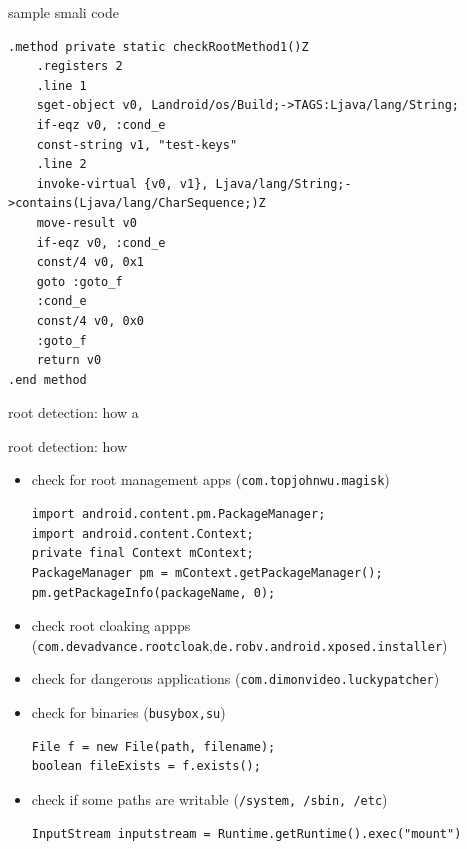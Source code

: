 \documentclass{beamer}
\begin{document}



\begin{frame}[fragile]{sample smali code}

\begin{verbatim}
.method private static checkRootMethod1()Z
    .registers 2
    .line 1
    sget-object v0, Landroid/os/Build;->TAGS:Ljava/lang/String;
    if-eqz v0, :cond_e
    const-string v1, "test-keys"
    .line 2
    invoke-virtual {v0, v1}, Ljava/lang/String;->contains(Ljava/lang/CharSequence;)Z
    move-result v0
    if-eqz v0, :cond_e
    const/4 v0, 0x1
    goto :goto_f
    :cond_e
    const/4 v0, 0x0
    :goto_f
    return v0
.end method
\end{verbatim}
    
\end{frame}

\begin{frame}[fragile]{root detection: how}
a
\end{frame}

\begin{frame}[fragile]{root detection: how}

    \begin{itemize}
        \item check for root management apps (\texttt{com.topjohnwu.magisk})
\begin{verbatim}
import android.content.pm.PackageManager;
import android.content.Context;
private final Context mContext;
PackageManager pm = mContext.getPackageManager();
pm.getPackageInfo(packageName, 0);
\end{verbatim}
        \item check root cloaking appps {\small (\texttt{com.devadvance.rootcloak},\texttt{de.robv.android.xposed.installer})}
        \item check for dangerous applications (\texttt{com.dimonvideo.luckypatcher})
        \item check for binaries (\texttt{busybox,su})
\begin{verbatim}
File f = new File(path, filename);
boolean fileExists = f.exists();
\end{verbatim}
        \item check if some paths are writable (\texttt{/system, /sbin, /etc})
\begin{verbatim}
InputStream inputstream = Runtime.getRuntime().exec("mount")
\end{verbatim}
    \end{itemize}

\end{frame}
\end{document}
